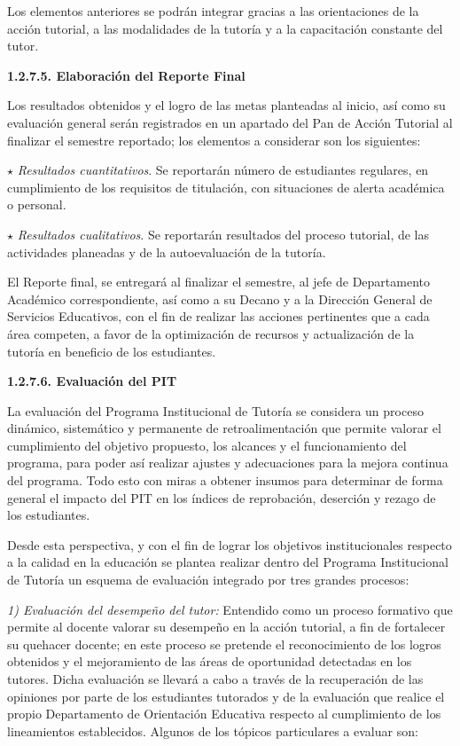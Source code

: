 Los elementos anteriores se podrán integrar gracias a las orientaciones de
la acción tutorial, a las modalidades de la tutoría y a la capacitación
constante del tutor.
\newpage

\medskip
{\bfseries 1.2.7.5. Elaboración del Reporte Final}

Los resultados obtenidos y el logro de las metas planteadas al inicio, así
como su evaluación general serán registrados en un apartado del Pan de
Acción Tutorial al finalizar el semestre reportado; los elementos a
considerar son los siguientes:

\begin{Obs}
\item[$\star$] \textit{Resultados cuantitativos}. Se reportarán número de estudiantes regulares,
en cumplimiento de los requisitos de titulación, con situaciones de alerta
académica o personal.
\item[$\star$] \textit{Resultados cualitativos}. Se reportarán resultados del proceso tutorial,
de las actividades planeadas y de la autoevaluación de la tutoría.
\end{Obs}

El Reporte final, se entregará al finalizar el semestre, al jefe de
Departamento Académico correspondiente, así como a su Decano y a la
Dirección General de Servicios Educativos, con el fin de realizar las
acciones pertinentes que a cada área competen, a favor de la optimización
de recursos y actualización de la tutoría en beneficio de los estudiantes.


\medskip
{\bfseries 1.2.7.6. Evaluación del PIT}

La evaluación del Programa Institucional de Tutoría se considera un proceso
dinámico, sistemático y permanente de retroalimentación que permite valorar
el cumplimiento del objetivo propuesto, los alcances y el funcionamiento
del programa, para poder así realizar ajustes y adecuaciones para la mejora
continua del programa. Todo esto con miras a obtener insumos para
determinar de forma general el impacto del PIT en los índices de
reprobación, deserción y rezago de los estudiantes.
\enlargethispage{1\baselineskip}

Desde esta perspectiva, y con el fin de lograr los objetivos institucionales
respecto a la calidad en la educación se plantea realizar dentro del
Programa Institucional de Tutoría un esquema de evaluación integrado por
tres grandes procesos:

\enlargethispage{1\baselineskip}
\textit{1) Evaluación del desempeño del tutor:} Entendido como un proceso
formativo que permite al docente valorar su desempeño en la acción
tutorial, a fin de fortalecer su quehacer docente; en este proceso se
pretende el reconocimiento de los logros obtenidos y el mejoramiento de las
áreas de oportunidad detectadas en los tutores. Dicha evaluación se llevará
a cabo a través de la recuperación de las opiniones por parte de los
estudiantes tutorados y de la evaluación que realice el propio Departamento
de Orientación Educativa respecto al cumplimiento de los lineamientos
establecidos. Algunos de los tópicos particulares a evaluar son:

